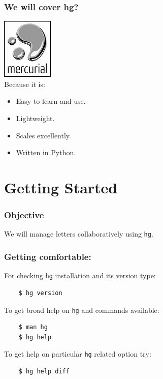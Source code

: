 \documentclass[14pt,compress]{beamer}
\newcounter{time}
\newcommand{\inctime}[1]{\addtocounter{time}{#1}{\tiny \thetime\ m}}
\newcommand{\typ}[1]{\lstinline{#1}}
\begin{document}
\begin{frame}
  \frametitle{We will cover hg?}
    \includegraphics[height=.75in, interpolate=true]{mercurial}\\
  Because it is:
  \begin{itemize}
  \item Easy to learn and use.
  \item Lightweight.
  \item Scales excellently.
  \item Written in Python.
  \end{itemize}
  \inctime{15}
\end{frame}

\section{Getting Started}

\begin{frame}
  \frametitle{Objective}
  \begin{block}{}
    We will \alert{manage} letters collaboratively using \typ{hg}.
  \end{block}

\end{frame}

\begin{frame}[fragile]
  \frametitle{Getting comfortable:}
  For checking \typ{hg} installation and its version type:
  \begin{lstlisting}
    $ hg version    
  \end{lstlisting}
  To get broad help on \typ{hg} and commands available:
  \begin{lstlisting}
    $ man hg
    $ hg help
  \end{lstlisting}
  To get help on particular \typ{hg} related option try:
  \begin{lstlisting}
    $ hg help diff
  \end{lstlisting} %
\end{frame}
\end{document}
